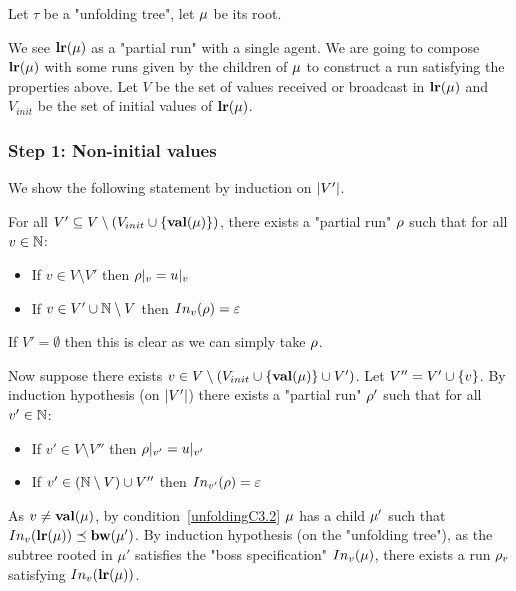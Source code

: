 	Let $\tau$ be a "unfolding tree", let $\node$ be its root.
	
	We see $\localrunlabel{\node}$ as a "partial run" with a single agent.
	We are going to compose $\localrunlabel{\node}$ with some runs given by the children of $\node$ to construct a run satisfying the properties above.
	Let $V$ be the set of values received or broadcast in $\localrunlabel{\node}$ and $V_{init}$ be the set of initial values of $\localrunlabel{\node}$.
	
	
	\subsubsection{Step 1: Non-initial values}
	\label{sec:tree-to-run-step-one}
	
	We show the following statement by induction on $\size{V'}$.
	
For all $V' \subseteq V \setminus (V_{init}\cup \set{\valuelabel{\node}})$, there exists a "partial run" $\run$ such that for all $v \in \nats$:
\begin{itemize}
	\item If $v \in V \setminus V'$ then $\vproj{v}{\run} = \vproj{v}{u}$
	
	\item If $v \in V' \cup \nats \setminus V$ then $\vinput{v}{\run} = \epsilon$
\end{itemize}  
	
	If $V' = \emptyset$ then this is clear as we can simply take $\run$.
	
	Now suppose there exists $v \in V \setminus (V_{init}\cup \set{\valuelabel{\node}} \cup V')$. Let $V'' = V' \cup \set{v}$. By induction hypothesis (on $\size{V'}$) there exists a "partial run" $\run'$ such that for all $v' \in \nats$:
	\begin{itemize}
		\item If $v' \in V \setminus V''$ then $\vproj{v'}{\run} = \vproj{v'}{u}$
		
		\item If $v' \in (\nats \setminus V) \cup V''$ then $\vinput{v'}{\run} = \epsilon$
	\end{itemize}

	As $v \neq \valuelabel{\node}$, by condition~\ref{unfoldingC3.2} $\node$ has a child $\node'$ such that $\vinput{v}{\localrunlabel{\mu}} \subword  \bosslabel{\node'}$.
	By induction hypothesis (on the "unfolding tree"), as the subtree rooted in $\mu'$ satisfies the "boss specification" $\vinput{v}{\mu}$, there exists a run $\run_v$ satisfying $\vinput{v}{\localrunlabel{\mu}}$.
	
